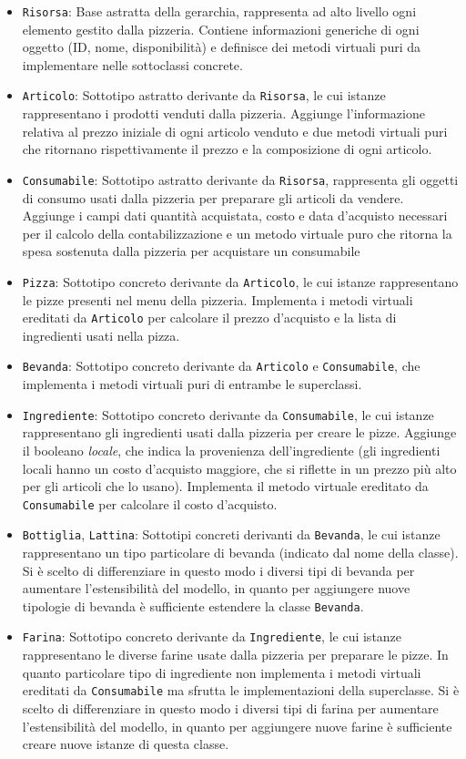 \documentclass[
  10pt,
]{article}
\begin{document}
\begin{itemize}
\item
  \texttt{Risorsa}: Base astratta della gerarchia, rappresenta ad alto
  livello ogni elemento gestito dalla pizzeria. Contiene informazioni
  generiche di ogni oggetto (ID, nome, disponibilità) e definisce dei
  metodi virtuali puri da implementare nelle sottoclassi concrete.
\item
  \texttt{Articolo}: Sottotipo astratto derivante da \texttt{Risorsa},
  le cui istanze rappresentano i prodotti venduti dalla pizzeria.
  Aggiunge l'informazione relativa al prezzo iniziale di ogni articolo
  venduto e due metodi virtuali puri che ritornano rispettivamente il
  prezzo e la composizione di ogni articolo.
\item
  \texttt{Consumabile}: Sottotipo astratto derivante da
  \texttt{Risorsa}, rappresenta gli oggetti di consumo usati dalla
  pizzeria per preparare gli articoli da vendere. Aggiunge i campi dati
  quantità acquistata, costo e data d'acquisto necessari per il calcolo
  della contabilizzazione e un metodo virtuale puro che ritorna la spesa
  sostenuta dalla pizzeria per acquistare un consumabile
\item
  \texttt{Pizza}: Sottotipo concreto derivante da \texttt{Articolo}, le
  cui istanze rappresentano le pizze presenti nel menu della pizzeria.
  Implementa i metodi virtuali ereditati da \texttt{Articolo} per
  calcolare il prezzo d'acquisto e la lista di ingredienti usati nella
  pizza.
\item
  \texttt{Bevanda}: Sottotipo concreto derivante da \texttt{Articolo} e
  \texttt{Consumabile}, che implementa i metodi virtuali puri di
  entrambe le superclassi.
\item
  \texttt{Ingrediente}: Sottotipo concreto derivante da
  \texttt{Consumabile}, le cui istanze rappresentano gli ingredienti
  usati dalla pizzeria per creare le pizze. Aggiunge il booleano
  \emph{locale}, che indica la provenienza dell'ingrediente (gli
  ingredienti locali hanno un costo d'acquisto maggiore, che si riflette
  in un prezzo più alto per gli articoli che lo usano). Implementa il
  metodo virtuale ereditato da \texttt{Consumabile} per calcolare il
  costo d'acquisto.
\item
  \texttt{Bottiglia}, \texttt{Lattina}: Sottotipi concreti derivanti da
  \texttt{Bevanda}, le cui istanze rappresentano un tipo particolare di
  bevanda (indicato dal nome della classe). Si è scelto di differenziare
  in questo modo i diversi tipi di bevanda per aumentare l'estensibilità
  del modello, in quanto per aggiungere nuove tipologie di bevanda è
  sufficiente estendere la classe \texttt{Bevanda}.
\item
  \texttt{Farina}: Sottotipo concreto derivante da \texttt{Ingrediente},
  le cui istanze rappresentano le diverse farine usate dalla pizzeria
  per preparare le pizze. In quanto particolare tipo di ingrediente non
  implementa i metodi virtuali ereditati da \texttt{Consumabile} ma
  sfrutta le implementazioni della superclasse. Si è scelto di
  differenziare in questo modo i diversi tipi di farina per aumentare
  l'estensibilità del modello, in quanto per aggiungere nuove farine è
  sufficiente creare nuove istanze di questa classe.
\end{itemize}
\end{document}
